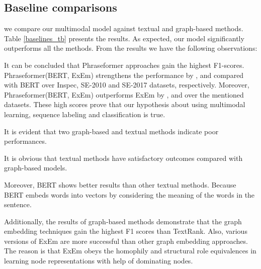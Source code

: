 \documentclass[review,3p]{elsarticle}
\begin{document}
\subsection{Baseline comparisons}
we compare our multimodal model against textual and graph-based methods. Table \ref{baselines_tb} presents the results. As expected, our model significantly outperforms all the methods. From the results we have the following observations:
\begin{enumerate*}[label={\roman*)},font={\bfseries}]
    \item It can be concluded that Phraseformer approaches gain the highest F1-scores. Phraseformer(BERT, ExEm) strengthens the performance by ,  and  compared with BERT over Inspec,   SE-2010  and SE-2017 datasets, respectively.  Moreover, Phraseformer(BERT, ExEm) outperforms ExEm  by ,  and  over the mentioned datasets. These high scores prove that our hypothesis about using multimodal learning, sequence labeling and classification is true.
	\item It is evident that two graph-based and textual methods indicate poor performances.
	\item It is obvious that textual methods have satisfactory outcomes compared with graph-based models.
    \item Moreover, BERT shows better results than other textual methods. Because BERT embeds words into vectors by considering the meaning of the words in the sentence.
    \item Additionally, the results of graph-based methods demonstrate that the graph embedding techniques gain the highest F1 scores than TextRank. Also, various versions of ExEm are more successful than other graph embedding approaches. The reason is that ExEm obeys the homophily and structural role equivalences in learning node representations with help of dominating nodes.
\end{enumerate*}
\end{document}
